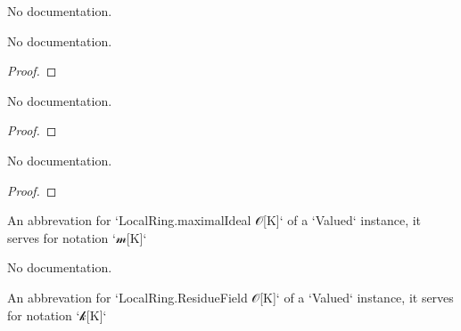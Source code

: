 \begin{theorem}\label{Valued.integerAlgebraMap.monotone}
                No documentation.
    \end{theorem}

\begin{theorem}\label{Valued.integer_val_coe}
        \leanok
                No documentation.
    \end{theorem}

\begin{proof}
    \leanok
\end{proof}

\begin{theorem}\label{Valued.valuationSubring_val_coe}
        \leanok
                No documentation.
    \end{theorem}

\begin{proof}
    \leanok
\end{proof}

\begin{theorem}\label{Valued.integer_val_le_one}
        \leanok
                No documentation.
    \end{theorem}

\begin{proof}
    \leanok
\end{proof}

\begin{definition}\label{Valued.maximalIdeal}
        \leanok
                An abbrevation for `LocalRing.maximalIdeal 𝒪[K]` of a `Valued` instance, it serves for notation `𝓂[K]`
    \end{definition}

\begin{theorem}\label{Valued.maximalIdeal_eq}
                No documentation.
    \end{theorem}

\begin{definition}\label{Valued.ResidueField}
        \leanok
                An abbrevation for `LocalRing.ResidueField 𝒪[K]` of a `Valued` instance, it serves for notation `𝓀[K]`
    \end{definition}


